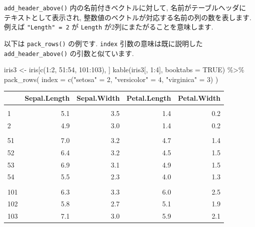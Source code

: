 \documentclass[
  11pt,
  lualatex,ja=standard,jafont=noto]{bxjsreport}
\newenvironment{Shaded}{\begin{snugshade}}{\end{snugshade}}
\newcommand{\AttributeTok}[1]{\textcolor[rgb]{0.77,0.63,0.00}{#1}}
\newcommand{\ConstantTok}[1]{\textcolor[rgb]{0.00,0.00,0.00}{#1}}
\newcommand{\DecValTok}[1]{\textcolor[rgb]{0.00,0.00,0.81}{#1}}
\newcommand{\FunctionTok}[1]{\textcolor[rgb]{0.00,0.00,0.00}{#1}}
\newcommand{\NormalTok}[1]{#1}
\newcommand{\OtherTok}[1]{\textcolor[rgb]{0.56,0.35,0.01}{#1}}
\newcommand{\SpecialCharTok}[1]{\textcolor[rgb]{0.00,0.00,0.00}{#1}}
\newcommand{\StringTok}[1]{\textcolor[rgb]{0.31,0.60,0.02}{#1}}
\begin{document}
\texttt{add\_header\_above()} 内の名前付きベクトルに対して, 名前がテーブルヘッダにテキストとして表示され, 整数値のベクトルが対応する名前の列の数を表します. 例えば \texttt{"Length" = 2} が \texttt{Length} が2列にまたがることを意味します.

以下は \texttt{pack\_rows()} の例です. \texttt{index} 引数の意味は既に説明した \texttt{add\_header\_above()} の引数と似ています.

\begin{Shaded}
\begin{Highlighting}[numbers=left,,]
\NormalTok{iris3 }\OtherTok{\textless{}{-}}\NormalTok{ iris[}\FunctionTok{c}\NormalTok{(}\DecValTok{1}\SpecialCharTok{:}\DecValTok{2}\NormalTok{, }\DecValTok{51}\SpecialCharTok{:}\DecValTok{54}\NormalTok{, }\DecValTok{101}\SpecialCharTok{:}\DecValTok{103}\NormalTok{), ]}
\FunctionTok{kable}\NormalTok{(iris3[, }\DecValTok{1}\SpecialCharTok{:}\DecValTok{4}\NormalTok{], }\AttributeTok{booktabs =} \ConstantTok{TRUE}\NormalTok{) }\SpecialCharTok{\%\textgreater{}\%} \FunctionTok{pack\_rows}\NormalTok{(}
  \AttributeTok{index =} \FunctionTok{c}\NormalTok{(}\StringTok{"setosa"} \OtherTok{=} \DecValTok{2}\NormalTok{, }\StringTok{"versicolor"} \OtherTok{=} \DecValTok{4}\NormalTok{, }\StringTok{"virginica"} \OtherTok{=} \DecValTok{3}\NormalTok{)}
\NormalTok{)}
\end{Highlighting}
\end{Shaded}

\begin{tabular}{lrrrr}
\toprule
  & Sepal.Length & Sepal.Width & Petal.Length & Petal.Width\\
\midrule
\addlinespace[0.3em]
\multicolumn{5}{l}{\textbf{setosa}}\\
\hspace{1em}1 & 5.1 & 3.5 & 1.4 & 0.2\\
\hspace{1em}2 & 4.9 & 3.0 & 1.4 & 0.2\\
\addlinespace[0.3em]
\multicolumn{5}{l}{\textbf{versicolor}}\\
\hspace{1em}51 & 7.0 & 3.2 & 4.7 & 1.4\\
\hspace{1em}52 & 6.4 & 3.2 & 4.5 & 1.5\\
\hspace{1em}53 & 6.9 & 3.1 & 4.9 & 1.5\\
\hspace{1em}54 & 5.5 & 2.3 & 4.0 & 1.3\\
\addlinespace[0.3em]
\multicolumn{5}{l}{\textbf{virginica}}\\
\hspace{1em}101 & 6.3 & 3.3 & 6.0 & 2.5\\
\hspace{1em}102 & 5.8 & 2.7 & 5.1 & 1.9\\
\hspace{1em}103 & 7.1 & 3.0 & 5.9 & 2.1\\
\bottomrule
\end{tabular}
\end{document}
